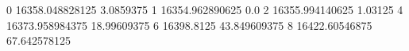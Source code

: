 0 16358.048828125 3.0859375
1 16354.962890625 0.0
2 16355.994140625 1.03125
4 16373.958984375 18.99609375
6 16398.8125 43.849609375
8 16422.60546875 67.642578125

